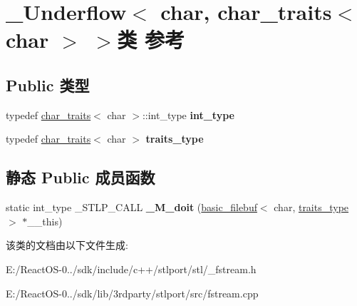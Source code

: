 \hypertarget{class___underflow_3_01char_00_01char__traits_3_01char_01_4_01_4}{}\section{\+\_\+\+Underflow$<$ char, char\+\_\+traits$<$ char $>$ $>$类 参考}
\label{class___underflow_3_01char_00_01char__traits_3_01char_01_4_01_4}
\subsection*{Public 类型}
\begin{DoxyCompactItemize}
\item 
\mbox{\label{class___underflow_3_01char_00_01char__traits_3_01char_01_4_01_4_adf603c124efd8d6be50114c80e194fba}} 
typedef \hyperlink{classchar__traits}{char\+\_\+traits}$<$ char $>$\+::int\+\_\+type {\bfseries int\+\_\+type}
\item 
\mbox{\label{class___underflow_3_01char_00_01char__traits_3_01char_01_4_01_4_a1811bdde3a26b5490ea501cbf253e54f}} 
typedef \hyperlink{classchar__traits}{char\+\_\+traits}$<$ char $>$ {\bfseries traits\+\_\+type}
\end{DoxyCompactItemize}
\subsection*{静态 Public 成员函数}
\begin{DoxyCompactItemize}
\item 
\mbox{\label{class___underflow_3_01char_00_01char__traits_3_01char_01_4_01_4_a264713c2a10ffb347622c60b3ec5e03d}} 
static int\+\_\+type \+\_\+\+S\+T\+L\+P\+\_\+\+C\+A\+LL {\bfseries \+\_\+\+M\+\_\+doit} (\hyperlink{classbasic__filebuf}{basic\+\_\+filebuf}$<$ char, \hyperlink{classchar__traits_3_01char_01_4}{traits\+\_\+type} $>$ $\ast$\+\_\+\+\_\+this)
\end{DoxyCompactItemize}


该类的文档由以下文件生成\+:\begin{DoxyCompactItemize}
\item 
E\+:/\+React\+O\+S-\/0../sdk/include/c++/stlport/stl/\+\_\+fstream.\+h\item 
E\+:/\+React\+O\+S-\/0../sdk/lib/3rdparty/stlport/src/fstream.\+cpp\end{DoxyCompactItemize}
